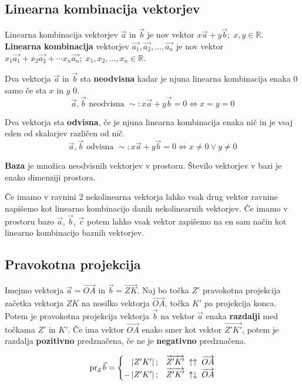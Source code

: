 \documentclass[a4paper,oneside,12pt,fleqn]{article}
\def\R{\ensuremath{\mathbb R}}
\newcommand{\pr}{\ensuremath{\operatorname{pr}}} %
\def\Vec{\overrightarrow}
\renewcommand\iff\Leftrightarrow
\numberwithin{equation}{section}
\begin{document}
\subsection{Linearna kombinacija vektorjev}
\label{sec:vec:linkomb}
Linearna kombinacija vektorjev $\vec{a}$ in $\vec{b}$ je nov vektor $x\vec{a} + y\vec{b};
\; x,y \in \R$.
\textbf{Linearna kombinacija} vektorjev $\vec{a_1},\vec{a_2},\ldots,\vec{a_n}$ je nov vektor
$x_1\vec{a_1} + x_2\vec{a_2} + \cdots x_n\vec{a_n}; \; x_1,x_2,\ldots,x_n \in \R$.

Dva vektorja $\vec{a}$ in $\vec{b}$ sta \textbf{neodvisna} kadar je njuna linearna kombinacija
enaka 0 samo če sta $x$ in $y$ 0.
\[ \vec{a},  \vec{b} \text{ neodvisna } \sim: x\vec{a} + y\vec{b} = 0 \iff x = y = 0 \]

Dva vektorja sta \textbf{odvisna}, če je njuna linearna kombinacija enaka nič in je vsaj eden od
skalarjev različen od nič.
\[ \vec{a},  \vec{b} \text{ odvisna } \sim: x\vec{a} + y\vec{b} = 0 \iff x \neq 0 \lor y \neq 0 \]

\textbf{Baza} je množica neodvisnih vektorjev v prostoru. Število vektorjev v bazi je enako
dimenziji prostora.

Če imamo v ravnini 2 nekolinearna vektorja lahko vsak drug vektor ravnine napišemo kot
linearno kombinacijo danih nekolinearnih vektorjev.
Če imamo v prostoru bazo $\vec{a}$, $\vec{b}$, $\vec{c}$ potem lahko vsak vektor zapišemo na en
sam način kot linearno kombinacijo baznih vektorjev.

\subsection{Pravokotna projekcija}
\label{sec:vec:proj}
Imejmo vektorja $\vec{a} = \Vec{OA}$ in $\vec{b} = \Vec{ZK}$. Naj bo točka $Z'$ pravokotna 
projekcija začetka vektorja $ZK$ na nosilko vektorja $\Vec{OA}$, točka $K'$ pa projekcija konca.
Potem je pravokotna projekcija vektorja $\vec{b}$ na vektor $\vec{a}$ enaka
\textbf{razdalji} med
točkama $Z'$ in $K'$. Če ima vektor $\Vec{OA}$ enako smer kot vektor $\Vec{Z'K'}$, potem
je razdalja \textbf{pozitivno} predznačena, če ne je \textbf{negativno} predznačena.

\[ \pr_{\vec{a}}\vec{b} = 
\begin{cases}
  \hfill \left| Z'K' \right|; & \Vec{Z'K'} \;\uparrow\uparrow\; \Vec{OA} \\
  \hfill -\left| Z'K' \right|; & \Vec{Z'K'} \;\uparrow\downarrow\; \Vec{OA} 
\end{cases} \]
\end{document}
